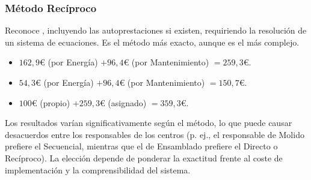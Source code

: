 \begin{ejemplo}
\subsubsection{Método Recíproco}
Reconoce , incluyendo las autoprestaciones si existen, requiriendo la resolución de un sistema de ecuaciones. Es el método más exacto, aunque es el más complejo.

\begin{itemize}
    \item {} $162,9 €$ (por Energía) $+ 96,4 €$ (por Mantenimiento) $= 259,3 €$.
    \item {} $54,3 €$ (por Energía) $+ 96,4 €$ (por Mantenimiento) $= 150,7 €$.
    \item {} $100 €$ (propio) $+ 259,3 €$ (asignado) $= 359,3 €$.
\end{itemize}
 Los resultados varían significativamente según el método, lo que puede causar desacuerdos entre los responsables de los centros (p. ej., el responsable de Molido prefiere el Secuencial, mientras que el de Ensamblado prefiere el Directo o Recíproco). La elección depende de ponderar la exactitud frente al coste de implementación y la comprensibilidad del sistema.
\end{ejemplo}
